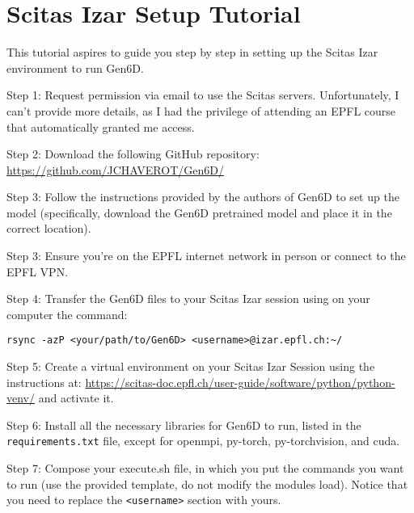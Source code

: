 \chapter{Scitas Izar Setup Tutorial}\label{chapter:scitas}

This tutorial aspires to guide you step by step in setting up the Scitas Izar environment to run Gen6D.

\bigskip
\bigskip

\noindent Step 1: Request permission via email to use the Scitas servers. Unfortunately, I can't provide more details, as I had the privilege of attending an EPFL course that automatically granted me access.

\bigskip


\noindent Step 2: Download the following GitHub repository: \\ \url{https://github.com/JCHAVEROT/Gen6D/}

\bigskip


\noindent Step 3: Follow the instructions provided by the authors of Gen6D to set up the model (specifically, download the Gen6D pretrained model and place it in the correct location).

\bigskip


\noindent Step 3: Ensure you're on the EPFL internet network in person or connect to the EPFL VPN.

\bigskip


\noindent Step 4: Transfer the Gen6D files to your Scitas Izar session using on your computer the command:
{ \captionsetup{labelformat=empty,labelsep=none}
\begin{lstlisting}[style=bashstyle, caption=\null]
rsync -azP <your/path/to/Gen6D> <username>@izar.epfl.ch:~/
\end{lstlisting}
}

\vspace{-0.4cm}

\noindent Step 5: Create a virtual environment on your Scitas Izar Session using the instructions at: \url{https://scitas-doc.epfl.ch/user-guide/software/python/python-venv/}  and activate it.

\bigskip


\noindent Step 6: Install all the necessary libraries for Gen6D to run, listed in the \texttt{requirements.txt} file, except for openmpi, py-torch, py-torchvision, and cuda.

\bigskip


\noindent Step 7: Compose your execute.sh file, in which you put the commands you want to run (use the provided template, do not modify the modules load). Notice that you need to replace the \texttt{<username>} section with yours.

